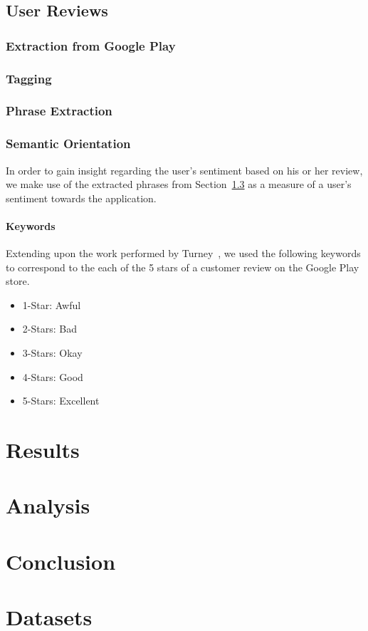 \documentclass[11pt]{report} %
\begin{document}
	\section{User Reviews}
		\subsection{Extraction from Google Play}
		\subsection{Tagging}
		\subsection{Phrase Extraction}
		\label{subsection:phrase_extraction}
		\subsection{Semantic Orientation}

In order to gain insight regarding the user's sentiment based on his or her review, we make use of the extracted phrases from 
Section~\ref{subsection:phrase_extraction} as a measure of a user's sentiment towards the application.

		\subsubsection{Keywords}

Extending upon the work performed by Turney~\cite{Turney2001}, we used the following keywords to correspond to the each of the 5 stars 
of a customer review on the Google Play store. 

\begin{itemize}
	\item 1-Star: Awful
	\item 2-Stars: Bad
	\item 3-Stars: Okay
	\item 4-Stars: Good
	\item 5-Stars: Excellent
\end{itemize}

\chapter{Results}

\chapter{Analysis}

\chapter{Conclusion}

\appendix
\chapter{Datasets}




\end{document}
